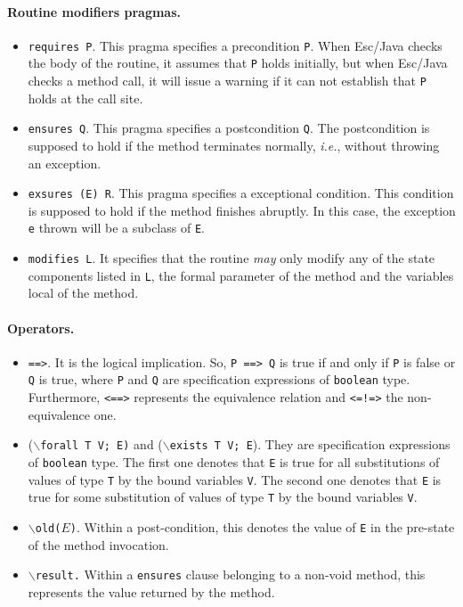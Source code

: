 \documentclass[a4paper]{llncs}
\begin{document}
\paragraph{\bf Routine modifiers pragmas.}
\begin{itemize}
\item{\texttt{requires P}.}
This pragma specifies a precondition {\tt P}.
When Esc/Java checks the body of the
routine, it assumes that \texttt{P} holds initially, but when
Esc/Java checks a method call, it will issue a warning if
it can not establish that \texttt{P} holds at the call site.

\item{\texttt{ensures Q}.}
This pragma specifies a postcondition \texttt{Q}. The postcondition 
is supposed to hold if the method terminates normally, \emph{i.e.},
without throwing an exception.

\item{\texttt{exsures (E) R}.}
This pragma specifies a exceptional condition. This condition is
supposed to hold if the method finishes abruptly. In this case,
the exception \texttt{e} thrown will be a subclass of \texttt{E}.

\item{\texttt{modifies L}.}
It specifies that the routine \emph{may} only modify any of
the state components listed in \texttt{L}, the formal parameter of
the method and the variables local of the method.
\end{itemize}



\paragraph{\bf Operators.}
\begin{itemize}
\item{\texttt{==>}.} It is the logical implication. So, \texttt{P
==> Q} is true if and only if \texttt{P} is false or \texttt{Q} is
true, where \texttt{P} and \texttt{Q} are specification expressions of 
\texttt{boolean} type. Furthermore, \texttt{<==>} represents the
equivalence relation and \texttt{<=!=>} the non-equivalence one.

\item {($\backslash$\texttt{forall T V; E)} and
($\backslash$\texttt{exists T V; E}).}
They are specification expressions of \texttt{boolean} type. The first one
denotes that \texttt{E} is true for all substitutions of values
of type \texttt{T} by the bound variables \texttt{V}. The second one
denotes that \texttt{E} is true for some substitution of values of
type \texttt{T} by the bound variables \texttt{V}.

\item{\texttt{$\backslash$old($E$)}.} Within a post-condition, this denotes
the value of \texttt{E} in the pre-state of the method invocation. 

\item {\tt$\backslash$result.} Within a \texttt{ensures} clause
belonging to a non-void method, this represents the value returned by
the method.

\end{itemize}
\end{document}
